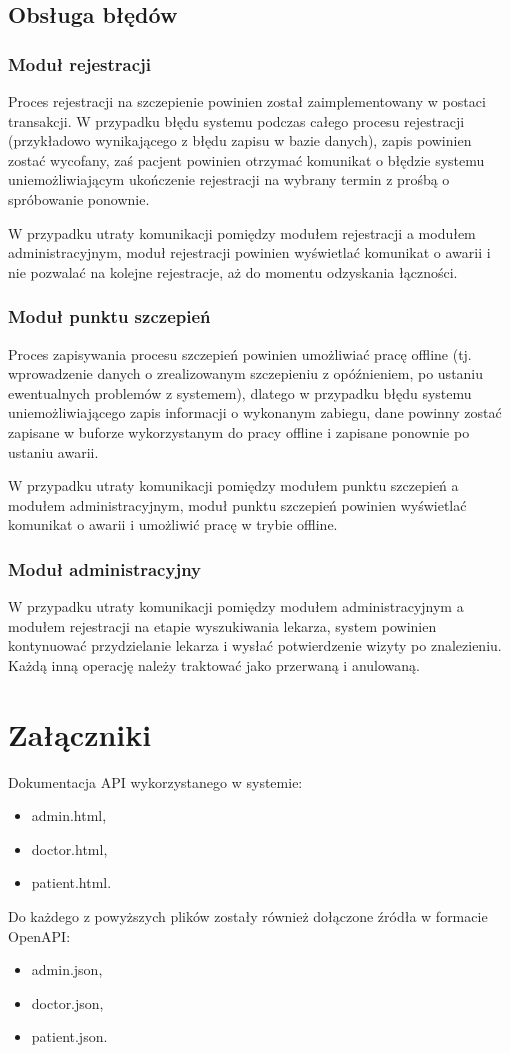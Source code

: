 \documentclass[a4paper,12pt,polish]{article}
\begin{document}
\subsection{Obsługa błędów}
\subsubsection{Moduł rejestracji}
Proces rejestracji na szczepienie powinien został zaimplementowany w postaci transakcji. W przypadku błędu systemu podczas całego procesu rejestracji (przykładowo wynikającego z błędu zapisu w bazie danych), zapis powinien zostać wycofany, zaś pacjent powinien otrzymać komunikat o błędzie systemu uniemożliwiającym ukończenie rejestracji na wybrany termin z prośbą o spróbowanie ponownie.

W przypadku utraty komunikacji pomiędzy modułem rejestracji a modułem administracyjnym, moduł rejestracji powinien wyświetlać komunikat o awarii i nie pozwalać na kolejne rejestracje, aż do momentu odzyskania łączności.

\subsubsection{Moduł punktu szczepień}
Proces zapisywania procesu szczepień powinien umożliwiać pracę offline (tj. wprowadzenie danych o zrealizowanym szczepieniu z opóźnieniem, po ustaniu ewentualnych problemów z systemem), dlatego w przypadku błędu systemu uniemożliwiającego zapis informacji o wykonanym zabiegu, dane powinny zostać zapisane w buforze wykorzystanym do pracy offline i zapisane ponownie po ustaniu awarii. 

W przypadku utraty komunikacji pomiędzy modułem punktu szczepień a modułem administracyjnym, moduł punktu szczepień powinien wyświetlać komunikat o awarii i umożliwić pracę w trybie offline.

\subsubsection{Moduł administracyjny}
W przypadku utraty komunikacji pomiędzy modułem administracyjnym a modułem rejestracji na etapie wyszukiwania lekarza, system powinien kontynuować przydzielanie lekarza i wysłać potwierdzenie wizyty po znalezieniu. Każdą inną operację należy traktować jako przerwaną i anulowaną.

\section{Załączniki}

Dokumentacja API wykorzystanego w systemie:
\begin{itemize}
    \item admin.html,
    \item doctor.html,
    \item patient.html.
\end{itemize}
Do każdego z powyższych plików zostały również dołączone źródła w formacie OpenAPI:
\begin{itemize}
    \item admin.json,
    \item doctor.json,
    \item patient.json.
\end{itemize}
\end{document}

